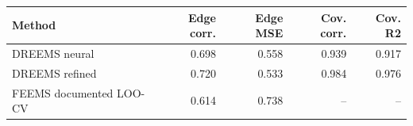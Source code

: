 \begin{tabular}{lrrrr}
\toprule
Method & Edge corr. & Edge MSE & Cov. corr. & Cov. R2 \\
\midrule
DREEMS neural & 0.698 & 0.558 & 0.939 & 0.917 \\
DREEMS refined & 0.720 & 0.533 & 0.984 & 0.976 \\
FEEMS documented LOO-CV & 0.614 & 0.738 & -- & -- \\
\bottomrule
\end{tabular}
